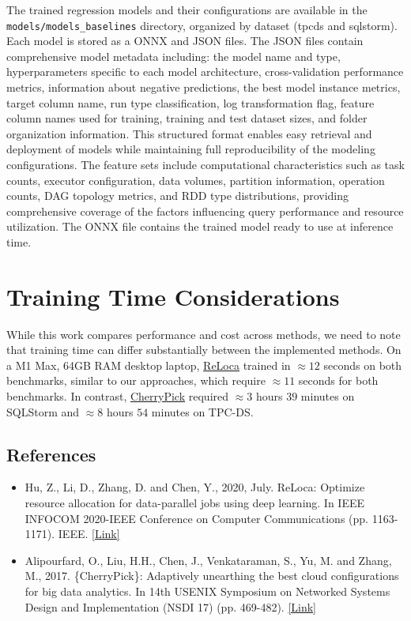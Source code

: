 The trained regression models and their configurations are available in the \texttt{models/models\_baselines} directory, organized by dataset (tpcds and sqlstorm). Each model is stored as a ONNX and JSON files. The JSON files contain comprehensive model metadata including: the model name and type, hyperparameters specific to each model architecture, cross-validation performance metrics, information about negative predictions, the best model instance metrics, target column name, run type classification, log transformation flag, feature column names used for training, training and test dataset sizes, and folder organization information. This structured format enables easy retrieval and deployment of models while maintaining full reproducibility of the modeling configurations. The feature sets include computational characteristics such as task counts, executor configuration, data volumes, partition information, operation counts, DAG topology metrics, and RDD type distributions, providing comprehensive coverage of the factors influencing query performance and resource utilization. The ONNX file contains the trained model ready to use at inference time.

\section{Training Time Considerations}

While this work compares performance and cost across methods, we need to note that training time can differ substantially between the implemented methods. On a M1 Max, 64GB RAM desktop laptop, \href{https://ieeexplore.ieee.org/document/9155521}{ReLoca} trained in $\approx 12$ seconds on both benchmarks, similar to our approaches, which require $\approx 11$ seconds for both benchmarks. In contrast, \href{https://www.usenix.org/system/files/conference/nsdi17/nsdi17-alipourfard.pdf}{CherryPick} required $\approx 3$ hours $39$ minutes on SQLStorm and $\approx 8$ hours $54$ minutes on TPC-DS.

\subsection*{References}

\begin{itemize}
    \item Hu, Z., Li, D., Zhang, D. and Chen, Y., 2020, July. ReLoca: Optimize resource allocation for data-parallel jobs using deep learning. In IEEE INFOCOM 2020-IEEE Conference on Computer Communications (pp. 1163-1171). IEEE. \href{https://ieeexplore.ieee.org/document/9155521}{[Link]}
    \item Alipourfard, O., Liu, H.H., Chen, J., Venkataraman, S., Yu, M. and Zhang, M., 2017. \{CherryPick\}: Adaptively unearthing the best cloud configurations for big data analytics. In 14th USENIX Symposium on Networked Systems Design and Implementation (NSDI 17) (pp. 469-482). \href{https://www.usenix.org/system/files/conference/nsdi17/nsdi17-alipourfard.pdf}{[Link]}
\end{itemize}

